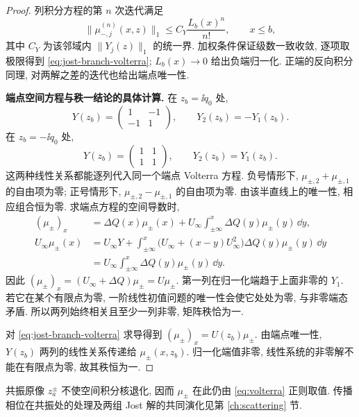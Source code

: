\begin{proof}
列积分方程的第 $n$ 次迭代满足
\[
\|\mu_{-,j}^{(n)}(x,z)\|_1
\le C_Y\dfrac{L_b(x)^n}{n!},\qquad x\le b,
\]
其中 $C_Y$ 为该邻域内 $\|Y_j(z)\|_1$ 的统一界. 加权条件保证级数一致收敛, 逐项取极限得到 \eqref{eq:jost-branch-volterra}; $L_b(x)\to0$ 给出负端归一化. 正端的反向积分同理, 对两解之差的迭代也给出端点唯一性.


\par\medskip\noindent\textbf{端点空间方程与秩一结论的具体计算.}\quad 
在 $z_b=\ii q_0$ 处,
\[
Y(z_b)=\begin{pmatrix}1&-1\\-1&1\end{pmatrix},
\qquad Y_2(z_b)=-Y_1(z_b).
\]
在 $z_b=-\ii q_0$ 处,
\[
Y(z_b)=\begin{pmatrix}1&1\\1&1\end{pmatrix},
\qquad Y_2(z_b)=Y_1(z_b).
\]
这两种线性关系都能逐列代入同一个端点 Volterra 方程.
负号情形下, $\mu_{\pm,2}+\mu_{\pm,1}$ 的自由项为零;
正号情形下, $\mu_{\pm,2}-\mu_{\pm,1}$ 的自由项为零.
由该半直线上的唯一性, 相应组合恒为零.
求端点方程的空间导数时,
\begin{align*}
(\mu_\pm)_x
&=\Delta Q(x)\mu_\pm(x)
+U_\infty\int_{\pm\infty}^{x}
\Delta Q(y)\mu_\pm(y)\,\dd y,\\
U_\infty\mu_\pm(x)
&=U_\infty Y
+\int_{\pm\infty}^{x}
\bigl(U_\infty+(x-y)U_\infty^2\bigr)
\Delta Q(y)\mu_\pm(y)\,\dd y\\
&=U_\infty\int_{\pm\infty}^{x}\Delta Q(y)\mu_\pm(y)\,\dd y.
\end{align*}
因此 $(\mu_\pm)_x=(U_\infty+\Delta Q)\mu_\pm=U\mu_\pm$.
第一列在归一化端趋于上面非零的 $Y_1$.
若它在某个有限点为零, 一阶线性初值问题的唯一性会使它处处为零,
与非零端态矛盾. 所以两列始终相关且至少一列非零, 矩阵秩恰为一.

对 \eqref{eq:jost-branch-volterra} 求导得到 $(\mu_\pm)_x=U(z_b)\mu_\pm$. 由端点唯一性, $Y(z_b)$ 两列的线性关系传递给 $\mu_\pm(x,z_b)$. 归一化端值非零, 线性系统的非零解不能在有限点为零, 故其秩恒为一.
\end{proof}

共振原像 $z_a^\pm$ 不使空间积分核退化, 因而 $\mu_\pm$ 在此仍由 \eqref{eq:volterra} 正则取值. 传播相位在共振处的处理及两组 Jost 解的共同演化见第 \ref{ch:scattering} 节.
